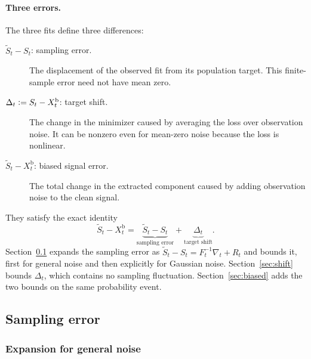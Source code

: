 \documentclass[11pt]{article}
\newcommand{\eqdef}{\mathrel{\vcentcolon=}}
\newcommand{\BiasedSignal}{X^{\mathrm b}}
\newcommand{\IMFs}{S}
\newcommand{\IMFt}{\widetilde S}
\newcommand{\IF}{F}
\theoremstyle{definition}
\begin{document}
\paragraph{Three errors.}
The three fits define three differences:
\begin{description}
\item[\(\IMFt_t-\IMFs_t\): sampling error.]
The displacement of the observed fit from its population target.  This
finite-sample error need not have mean zero.
\item[\(\Delta_t\eqdef\IMFs_t-\BiasedSignal_t\): target shift.]
The change in the minimizer caused by averaging the loss over observation
noise.  It can be nonzero even for mean-zero noise because the loss is
nonlinear.
\item[\(\IMFt_t-\BiasedSignal_t\): biased signal error.]
The total change in the extracted component caused by adding observation
noise to the clean signal.
\end{description}
They satisfy the exact identity
\begin{equation}
  \boxed{\;\IMFt_t-\BiasedSignal_t
    =\underbrace{\IMFt_t-\IMFs_t}_{\text{sampling error}}
     +\underbrace{\Delta_t}_{\text{target shift}}.\;}
  \label{eq:target-translation}
\end{equation}
Section~\ref{sec:sampling} expands the sampling error as
\(\IMFt_t-\IMFs_t=\IF_t^{-1}\nabla_t+R_t\) and bounds it, first for general
noise and then explicitly for Gaussian noise.  Section~\ref{sec:shift} bounds
\(\Delta_t\), which contains no sampling fluctuation.  Section~\ref{sec:biased}
adds the two bounds on the same probability event.

\subsection{Sampling error}\label{sec:sampling}

\subsubsection{Expansion for general noise}\label{sec:model}
\end{document}
